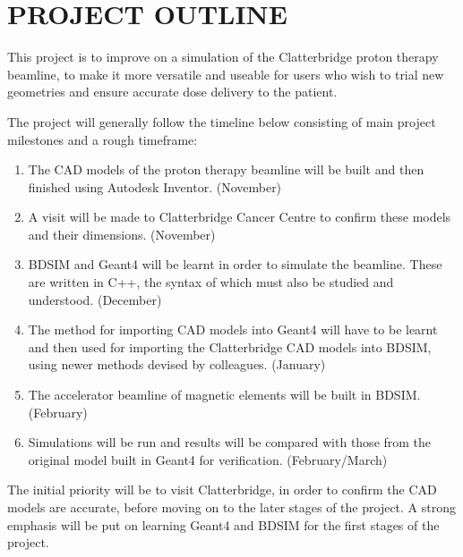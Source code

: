\documentclass[a4paper, 12pt, conference]
{ieeeconf}      %
\begin{document}
\section{PROJECT OUTLINE}

This project is to improve on a simulation of the Clatterbridge proton therapy beamline, to make it more versatile and useable for users who wish to trial new geometries and ensure accurate dose delivery to the patient.

The project will generally follow the timeline below consisting of main project milestones and a rough timeframe:

\begin{enumerate}
    \item The CAD models of the proton therapy beamline will be built and then finished using Autodesk Inventor. (November)
	\item A visit will be made to Clatterbridge Cancer Centre to confirm these models and their dimensions. (November)
	\item BDSIM and Geant4 will be learnt in order to simulate the beamline. These are written in C++, the syntax of which must also be studied and understood. (December)
	\item The method for importing CAD models into Geant4 will have to be learnt and then used for importing the Clatterbridge CAD models into BDSIM, using newer methods devised by colleagues. (January)
	\item The accelerator beamline of magnetic elements will be built in BDSIM. (February)
    \item Simulations will be run and results will be compared with those from the original model built in Geant4 for verification. (February/March)
\end{enumerate}

The initial priority will be to visit Clatterbridge, in order to confirm the CAD models are accurate, before moving on to the later stages of the project. A strong emphasis will be put on learning Geant4 and BDSIM for the first stages of the project.





\addtolength{\textheight}{-12cm}   %
\end{document}
